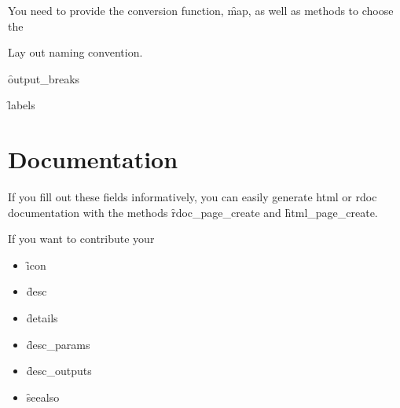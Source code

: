 You need to provide the conversion function, \f{map}, as well as methods to choose the 

Lay out naming convention.


\f{output_breaks}

\f{labels}

\section{Documentation}
\label{sec:documentation}

If you fill out these fields informatively, you can easily generate html or rdoc documentation with the methods \f{rdoc_page_create} and \f{html_page_create}.

If you want to contribute your

\begin{itemize}
  \item \f{icon}
  \item \f{desc}
  \item \f{details}
  \item \f{desc_params}
  \item \f{desc_outputs}
  \item \f{seealso}
\end{itemize}


